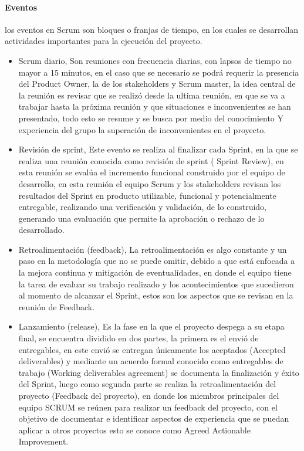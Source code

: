 \paragraph{Eventos}
los eventos en Scrum son bloques o franjas de tiempo, en los cuales se desarrollan actividades importantes para la ejecución del proyecto.
\begin{itemize}
    
    \item Scrum diario, Son reuniones con frecuencia diarias, con lapsos de tiempo no mayor a 15 minutos, en el caso que se necesario se podrá requerir la presencia del Product Owner, la de los stakeholders y Scrum master, la idea central de la reunión es revisar que se realizó desde la ultima reunión, en que se va a trabajar hasta la próxima reunión y que situaciones e inconvenientes se han presentado, todo esto se resume y se busca por medio del conocimiento Y experiencia del grupo la superación de inconvenientes en el proyecto. 
    \item Revisión de sprint, Este evento se realiza al finalizar cada Sprint, en la que se realiza una reunión conocida como revisión de sprint ( Sprint Review), en esta reunión se evalúa el incremento funcional construido por el equipo de desarrollo, en esta reunión el equipo Scrum y los stakeholders revisan los resultados del Sprint en producto utilizable, funcional y potencialmente entregable, realizando una verificación y validación, de lo construido, generando una evaluación que permite la aprobación o rechazo de lo desarrollado.  
    
     \item Retroalimentación (feedback), La retroalimentación es algo constante y un paso en la metodología que no se puede omitir, debido a que está enfocada a la mejora continua y mitigación de eventualidades, en donde el equipo tiene la tarea de evaluar su trabajo realizado y los acontecimientos que sucedieron al momento de alcanzar el Sprint, estos son los aspectos que se revisan en la reunión de Feedback.
     
     \item Lanzamiento (release), Es la fase en la que el proyecto despega a su etapa final, se encuentra dividido en dos partes, la primera es el envió de entregables, en este envió se entregan únicamente los aceptados (Accepted deliverables) y mediante un acuerdo formal conocido como entregables de trabajo (Working deliverables agreement) se documenta la finalización y éxito del Sprint, luego como segunda parte se realiza la retroalimentación del proyecto (Feedback del proyecto), en donde los miembros principales del equipo SCRUM se reúnen para realizar un feedback del proyecto, con el objetivo de documentar e identificar aspectos de experiencia que se puedan aplicar a otros proyectos esto se conoce como Agreed Actionable Improvement. 
     

\end{itemize}

